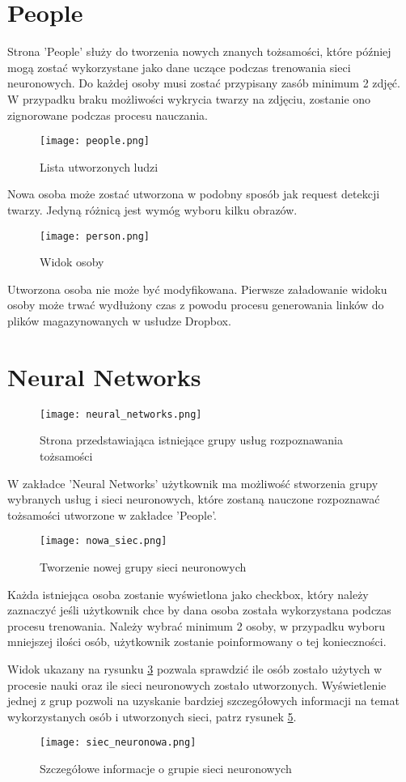 \section{People}
Strona 'People' służy do tworzenia nowych znanych tożsamości, które później mogą zostać wykorzystane jako dane uczące podczas trenowania sieci neuronowych. Do każdej osoby musi zostać przypisany zasób minimum 2 zdjęć. W przypadku braku możliwości wykrycia twarzy na zdjęciu, zostanie ono zignorowane podczas procesu nauczania.
\begin{figure}[H]
	\centering
	\texttt{[image: people.png]}
	\caption{Lista utworzonych ludzi}
	\label{fig:people}
\end{figure}
Nowa osoba może zostać utworzona w podobny sposób jak request detekcji twarzy. Jedyną różnicą jest wymóg wyboru kilku obrazów.
\begin{figure}[H]
	\centering
	\texttt{[image: person.png]}
	\caption{Widok osoby}
	\label{fig:person}
\end{figure}
Utworzona osoba nie może być modyfikowana. Pierwsze załadowanie widoku osoby może trwać wydłużony czas z powodu procesu generowania linków do plików magazynowanych w usłudze Dropbox.

\section{Neural Networks}
\begin{figure}[H]
	\centering
	\texttt{[image: neural\_networks.png]}
	\caption{Strona przedstawiająca istniejące grupy usług rozpoznawania tożsamości}
	\label{fig:sieci_neuronowe}
\end{figure}
W zakładce 'Neural Networks' użytkownik ma możliwość stworzenia grupy wybranych usług i sieci neuronowych, które zostaną nauczone rozpoznawać tożsamości utworzone w zakładce 'People'.
\begin{figure}[H]
	\centering
	\texttt{[image: nowa\_siec.png]}
	\caption{Tworzenie nowej grupy sieci neuronowych}
	\label{fig:nowa_siec}
\end{figure}
Każda istniejąca osoba zostanie wyświetlona jako checkbox, który należy zaznaczyć jeśli użytkownik chce by dana osoba została wykorzystana podczas procesu trenowania. Należy wybrać minimum 2 osoby, w przypadku wyboru mniejszej ilości osób, użytkownik zostanie poinformowany o tej konieczności.

Widok ukazany na rysunku \ref{fig:sieci_neuronowe} pozwala sprawdzić ile osób zostało użytych w procesie nauki oraz ile sieci neuronowych zostało utworzonych. Wyświetlenie jednej z grup pozwoli na uzyskanie bardziej szczegółowych informacji na temat wykorzystanych osób i utworzonych sieci, patrz rysunek \ref{fig:siec_neuronowa}.
\begin{figure}[H]
	\centering
	\texttt{[image: siec\_neuronowa.png]}
	\caption{Szczegółowe informacje o grupie sieci neuronowych}
	\label{fig:siec_neuronowa}
\end{figure}

